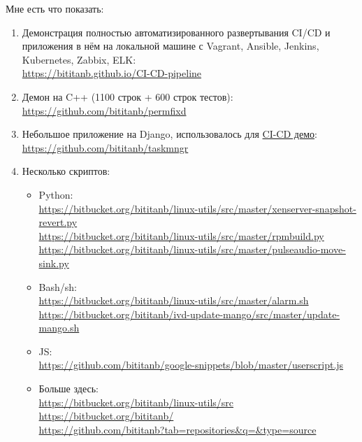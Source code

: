 \documentclass[11pt, a4paper]{article}
\begin{document}
Мне есть что показать:
\begin{enumerate}
  \item Демонстрация полностью автоматизированного развертывания CI/CD и приложения в нём на локальной машине с Vagrant, Ansible, Jenkins, Kubernetes, Zabbix, ELK:\\
    \url{https://bititanb.github.io/CI-CD-pipeline}
  \item Демон на C++ (1100 строк + 600 строк тестов):\\
    \url{https://github.com/bititanb/permfixd}
  \item Небольшое приложение на Django, использовалось для \href{https://github.com/bititanb/CI-CD-pipeline}{CI-CD демо}:\\
    \url{https://github.com/bititanb/taskmngr}
  \item Несколько скриптов:
    \begin{itemize}
      \item Python:\\
        \url{https://bitbucket.org/bititanb/linux-utils/src/master/xenserver-snapshot-revert.py}\\
        \url{https://bitbucket.org/bititanb/linux-utils/src/master/rpmbuild.py}\\
        \url{https://bitbucket.org/bititanb/linux-utils/src/master/pulseaudio-move-sink.py}
      \item Bash/sh:\\
        \url{https://bitbucket.org/bititanb/linux-utils/src/master/alarm.sh}\\
        \url{https://bitbucket.org/bititanb/ivd-update-mango/src/master/update-mango.sh}
      \item JS:\\
        \url{https://github.com/bititanb/google-snippets/blob/master/userscript.js}
      \item Больше здесь:\\
        \url{https://bitbucket.org/bititanb/linux-utils/src}\\
        \url{https://bitbucket.org/bititanb/}\\
        \url{https://github.com/bititanb?tab=repositories&q=&type=source}
    \end{itemize}
\end{enumerate}
\end{document}
